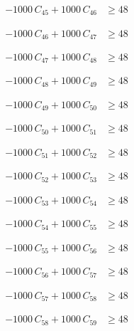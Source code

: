 \documentclass[a4paper,11pt]{article}
\begin{document}
\begin{align}
-1000\,C_{45} + 1000\,C_{46} &\geq 48 \nonumber
\end{align}

\begin{align}
-1000\,C_{46} + 1000\,C_{47} &\geq 48 \nonumber
\end{align}

\begin{align}
-1000\,C_{47} + 1000\,C_{48} &\geq 48 \nonumber
\end{align}

\begin{align}
-1000\,C_{48} + 1000\,C_{49} &\geq 48 \nonumber
\end{align}

\begin{align}
-1000\,C_{49} + 1000\,C_{50} &\geq 48 \nonumber
\end{align}

\begin{align}
-1000\,C_{50} + 1000\,C_{51} &\geq 48 \nonumber
\end{align}

\begin{align}
-1000\,C_{51} + 1000\,C_{52} &\geq 48 \nonumber
\end{align}

\begin{align}
-1000\,C_{52} + 1000\,C_{53} &\geq 48 \nonumber
\end{align}

\begin{align}
-1000\,C_{53} + 1000\,C_{54} &\geq 48 \nonumber
\end{align}

\begin{align}
-1000\,C_{54} + 1000\,C_{55} &\geq 48 \nonumber
\end{align}

\begin{align}
-1000\,C_{55} + 1000\,C_{56} &\geq 48 \nonumber
\end{align}

\begin{align}
-1000\,C_{56} + 1000\,C_{57} &\geq 48 \nonumber
\end{align}

\begin{align}
-1000\,C_{57} + 1000\,C_{58} &\geq 48 \nonumber
\end{align}

\begin{align}
-1000\,C_{58} + 1000\,C_{59} &\geq 48 \nonumber
\end{align}
\end{document}
